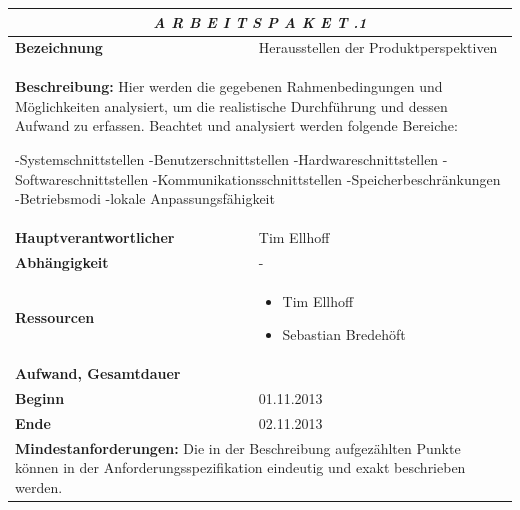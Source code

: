 \documentclass[fontsize=12pt,paper=a4,twoside]{scrartcl}
\begin{document}
\begin{tabular}{p{7.5cm}|p{7.5cm}}\toprule
\multicolumn{2}{c}{\textbf{\textit{A R B E I T S P A K E T \quad 2.2.1}}} \\ \toprule \hline
\textbf{Bezeichnung} & Herausstellen der Produktperspektiven\\\hline
\multicolumn{2}{p{15cm}}{\textbf{Beschreibung:} \newline 
Hier werden die gegebenen Rahmenbedingungen und Möglichkeiten analysiert, um die realistische Durchführung und dessen Aufwand zu erfassen. Beachtet und analysiert werden folgende Bereiche:\newline 

-Systemschnittstellen    \newline       
-Benutzerschnittstellen  \newline  
-Hardwareschnittstellen \newline        
-Softwareschnittstellen  \newline 
-Kommunikationsschnittstellen  \newline 
-Speicherbeschränkungen    \newline      
-Betriebsmodi     \newline              
-lokale Anpassungsfähigkeit

}  \\\hline
\textbf{Hauptverantwortlicher} & Tim Ellhoff \\\hline
\textbf{Abhängigkeit} & -\\\hline
\textbf{Ressourcen} & \begin{itemize} 
\itemsep0pt
\item Tim Ellhoff
\item Sebastian Bredehöft
\end{itemize} \\\hline
\textbf{Aufwand, Gesamtdauer} & \\\hline
\textbf{Beginn} & 01.11.2013 \\\hline
\textbf{Ende} & 02.11.2013\\\hline
\multicolumn{2}{p{15cm}}{\textbf{Mindestanforderungen: } \newline
Die in der Beschreibung aufgezählten Punkte können in der Anforderungsspezifikation eindeutig und exakt beschrieben werden. }  \\ \toprule
\end{tabular} \\\\
\end{document}

